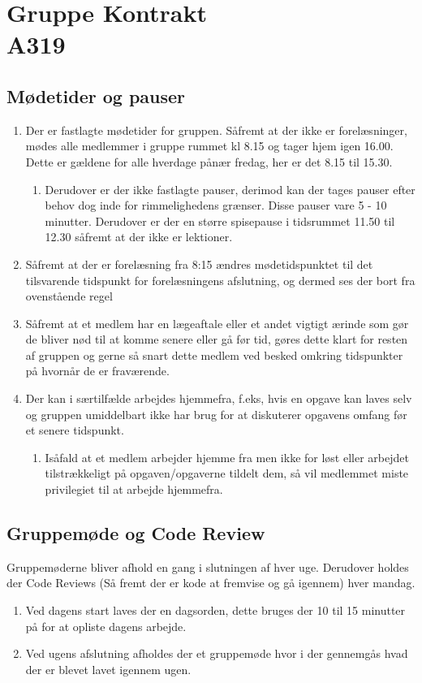 \chapter{Gruppe Kontrakt\\A319}
\section{Mødetider og pauser}
\begin{enumerate}
\item Der er fastlagte mødetider for gruppen. Såfremt at der ikke er forelæsninger, mødes alle medlemmer i gruppe rummet kl 8.15 og tager hjem igen 16.00. Dette er gældene for alle hverdage pånær fredag, her er det 8.15 til 15.30.
\begin{enumerate}
\item Derudover er der ikke fastlagte pauser, derimod kan der tages pauser efter behov dog inde for rimmelighedens grænser. Disse pauser vare 5 - 10 minutter. Derudover er der en større spisepause i tidsrummet 11.50 til 12.30 såfremt at der ikke er lektioner.
\end{enumerate}
\item Såfremt at der er forelæsning fra 8:15 ændres mødetidspunktet til det tilsvarende tidspunkt for forelæsningens afslutning, og dermed ses der bort fra ovenstående regel
\item Såfremt at et medlem har en lægeaftale eller et andet vigtigt ærinde som gør de bliver nød til at komme senere eller gå før tid, gøres dette klart for resten af gruppen og gerne så snart dette medlem ved besked omkring tidspunkter på hvornår de er fraværende.
\item Der kan i særtilfælde arbejdes hjemmefra, f.eks, hvis en opgave kan laves selv og gruppen umiddelbart ikke har brug for at diskuterer opgavens omfang før et senere tidspunkt.
\begin{enumerate}
\item Isåfald at et medlem arbejder hjemme fra men ikke for løst eller arbejdet tilstrækkeligt på opgaven/opgaverne tildelt dem, så vil medlemmet miste privilegiet til at arbejde hjemmefra.
\end{enumerate}
\end{enumerate}

\section{Gruppemøde og Code Review}
Gruppemøderne bliver afhold en gang i slutningen af hver uge. Derudover holdes der Code Reviews (Så fremt der er kode at fremvise og gå igennem) hver mandag.
\begin{enumerate}
\item Ved dagens start laves der en dagsorden, dette bruges der 10 til 15 minutter på for at opliste dagens arbejde.
\item Ved ugens afslutning afholdes der et gruppemøde hvor i der gennemgås hvad der er blevet lavet igennem ugen.
\end{enumerate}

